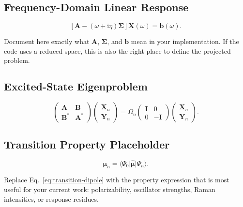 \documentclass[11pt]{article}
\numberwithin{equation}{section}
\newcommand{\ii}{\mathrm{i}}
\newcommand{\vect}[1]{\bm{#1}}
\newcommand{\mat}[1]{\bm{#1}}
\newcommand{\op}[1]{\hat{#1}}
\newcommand{\bra}[1]{\langle #1 \rvert}
\newcommand{\ket}[1]{\lvert #1 \rangle}
\newcommand{\state}[1]{\ket{\Psi_{#1}}}
\newcommand{\gs}{\Psi_0}
\newcommand{\ident}{\mat{I}}
\newcommand{\Aresp}{\mat{A}}
\newcommand{\Bresp}{\mat{B}}
\newcommand{\metric}{\mat{\Sigma}}
\newcommand{\Xresp}{\vect{X}}
\newcommand{\Yresp}{\vect{Y}}
\newcommand{\rhs}{\vect{b}}
\newcommand{\freq}{\omega}
\newcommand{\freqshift}{\eta}
\newcommand{\exenergy}[1]{\Omega_{#1}}
\newcommand{\response}[2]{#1\!\left(#2\right)}
\begin{document}
\subsection{Frequency-Domain Linear Response}

\begin{equation}
  \left[\Aresp - (\freq + \ii \freqshift)\metric\right]
  \response{\Xresp}{\freq}
  =
  \response{\rhs}{\freq}.
  \label{eq:linear-response}
\end{equation}

Document here exactly what \(\Aresp\), \(\metric\), and \(\rhs\) mean in your
implementation. If the code uses a reduced space, this is also the right place
to define the projected problem.

\subsection{Excited-State Eigenproblem}

\begin{equation}
  \begin{pmatrix}
    \Aresp & \Bresp \\
    \Bresp^{*} & \Aresp^{*}
  \end{pmatrix}
  \begin{pmatrix}
    \Xresp_{n} \\
    \Yresp_{n}
  \end{pmatrix}
  =
  \exenergy{n}
  \begin{pmatrix}
    \ident & 0 \\
    0 & -\ident
  \end{pmatrix}
  \begin{pmatrix}
    \Xresp_{n} \\
    \Yresp_{n}
  \end{pmatrix}.
  \label{eq:excited-state}
\end{equation}

\subsection{Transition Property Placeholder}

\begin{equation}
  \vect{\mu}_{n}
  =
  \bra{\gs}\op{\vect{\mu}}\state{n}.
  \label{eq:transition-dipole}
\end{equation}

Replace Eq.~\eqref{eq:transition-dipole} with the property expression that is
most useful for your current work: polarizability, oscillator strengths, Raman
intensities, or response residues.
\end{document}

